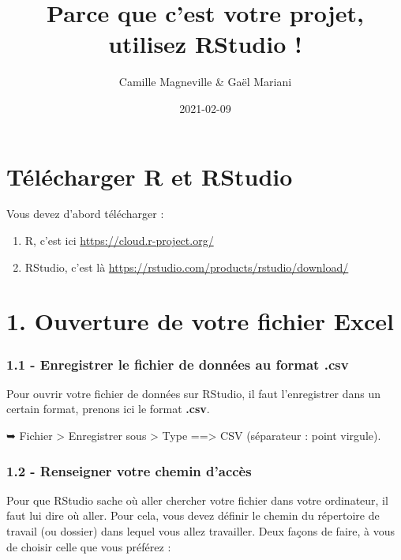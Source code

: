 \documentclass[
]{article}
\title{Parce que c'est votre projet, utilisez RStudio !}
\author{Camille Magneville \& Gaël Mariani}
\date{2021-02-09}
\providecommand{\tightlist}{%
  \setlength{\itemsep}{0pt}\setlength{\parskip}{0pt}}
\begin{document}
\maketitle

\hypertarget{tuxe9luxe9charger-r-et-rstudio}{%
\section{Télécharger R et
RStudio}\label{tuxe9luxe9charger-r-et-rstudio}}

Vous devez d'abord télécharger :

\begin{enumerate}
\def\labelenumi{\arabic{enumi}.}
\tightlist
\item
  R, c'est ici \url{https://cloud.r-project.org/}
\item
  RStudio, c'est là \url{https://rstudio.com/products/rstudio/download/}
\end{enumerate}

\hypertarget{ouverture-de-votre-fichier-excel}{%
\section{1. Ouverture de votre fichier
Excel}\label{ouverture-de-votre-fichier-excel}}

\hypertarget{enregistrer-le-fichier-de-donnuxe9es-au-format-.csv}{%
\subsubsection{1.1 - Enregistrer le fichier de données au format
.csv}\label{enregistrer-le-fichier-de-donnuxe9es-au-format-.csv}}

Pour ouvrir votre fichier de données sur RStudio, il faut l'enregistrer
dans un certain format, prenons ici le format \textbf{.csv}.

➥ Fichier \textgreater{} Enregistrer sous \textgreater{} Type
==\textgreater{} CSV (séparateur : point virgule).

\hypertarget{renseigner-votre-chemin-daccuxe8s}{%
\subsubsection{1.2 - Renseigner votre chemin
d'accès}\label{renseigner-votre-chemin-daccuxe8s}}

Pour que RStudio sache où aller chercher votre fichier dans votre
ordinateur, il faut lui dire où aller. Pour cela, vous devez définir le
chemin du répertoire de travail (ou dossier) dans lequel vous allez
travailler. Deux façons de faire, à vous de choisir celle que vous
préférez :
\end{document}
